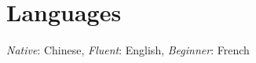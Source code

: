 \section{\sc Languages}

\textit{Native}: Chinese, \textit{Fluent}: English,
  \textit{Beginner}: French

\endinput